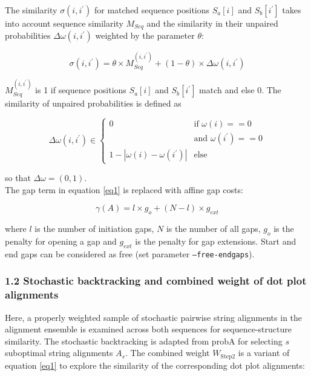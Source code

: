 \documentclass{bmcart}
\begin{document}
\noindent The similarity $\sigma(i,i^\prime)$ for matched sequence positions $S_a[i]$ and
$S_b[i^\prime]$ takes into account sequence similarity $M_{Seq}$ and the
similarity in their unpaired probabilities $\Delta \omega(i,i^\prime)$ weighted
by the parameter $\theta$:

\begin{equation}\label{sigmam}
	\sigma(i,i^\prime) = \theta \times
		M_{Seq}^{(i,i^\prime)} + (1-\theta) \times \Delta \omega(i,i^\prime)
\end{equation}

\noindent  $M_{Seq}^{(i,i^\prime)}$ is 1 if sequence positions $S_a[i]$ and
$S_b[i^\prime]$ match and else 0. The similarity of unpaired probabilities is
defined as

\begin{equation}\label{eq3}
	\Delta \omega(i,i^\prime) \in \left\{ \begin{array}{cl}
			0 & \textrm{if } \omega(i) == 0 \\
			  & \textrm{and } \omega(i^\prime ) == 0 \\
			1 - | \omega(i) - \omega(i^\prime) | & \textrm{else}
		\end{array}\right.
\end{equation}

\noindent so that $\Delta \omega = (0,1)$. \\

The gap term in equation \ref{eq1} is replaced with affine gap costs:

\begin{equation}\label{eq6}
	\gamma(A) = l \times g_o + (N-l) \times g_{ext}
\end{equation}
	
\noindent where $l$ is the number of initiation gaps, $N$ is the number of all gaps,
$g_o$ is the penalty for opening a gap and $g_{ext}$ is the penalty for gap
extensions. Start and end gaps can be considered as free (set parameter \texttt{--free-endgaps}). \\

\subsubsection*{1.2 Stochastic backtracking and combined weight of dot plot alignments}

Here, a properly weighted sample of stochastic pairwise string alignments
in the alignment ensemble is examined across both sequences for sequence-structure similarity.
The stochastic backtracking is adapted from probA \cite{Muckstein12385998} for
selecting $s$ suboptimal string alignments $A_s$.  The combined weight
$W_{\mbox{Step2}}$ is a variant of equation \ref{eq1} to explore the similarity
of the corresponding dot plot alignments:
\end{document}
